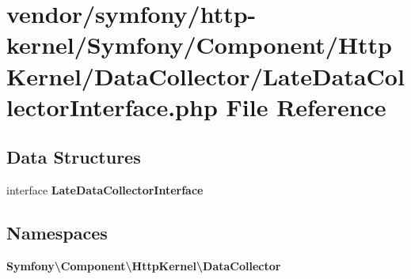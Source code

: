 \section{vendor/symfony/http-\/kernel/\+Symfony/\+Component/\+Http\+Kernel/\+Data\+Collector/\+Late\+Data\+Collector\+Interface.php File Reference}
\label{_late_data_collector_interface_8php}
\subsection*{Data Structures}
\begin{DoxyCompactItemize}
\item 
interface {\bf Late\+Data\+Collector\+Interface}
\end{DoxyCompactItemize}
\subsection*{Namespaces}
\begin{DoxyCompactItemize}
\item 
 {\bf Symfony\textbackslash{}\+Component\textbackslash{}\+Http\+Kernel\textbackslash{}\+Data\+Collector}
\end{DoxyCompactItemize}
